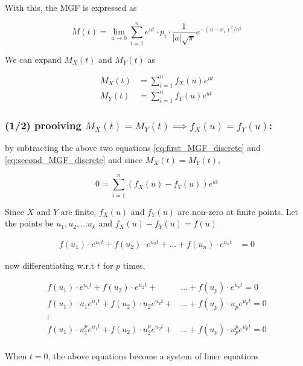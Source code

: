 \documentclass[openany]{book}
\begin{document}
	With this, the MGF is expressed as 
	
	\[ M(t) = \lim_{a \rightarrow 0} \sum_{i=1}^{n} e^{ut} \cdot p_i \cdot \frac{1}{|a|\sqrt{\pi}}e^{-(u-x_i)^2/a^2} \]
	
	We can expand $M_X(t)$ and $M_Y(t)$ as 
	
	\begin{align}
		M_X(t) &= \sum_{i=1}^{n} f_X(u) e^{ut}  \label{eq:first_MGF_discrete}\\
		M_Y(t) &= \sum_{i=1}^{n} f_Y(u) e^{ut}  \label{eq:second_MGF_discrete}
	\end{align}
	
	\subsubsection*{(1/2) prooiving $M_X(t) = M_Y(t) \implies f_X(u) = f_Y(u)$:}
	
	by subtracting the above two equations \ref{eq:first_MGF_discrete} and \ref{eq:second_MGF_discrete} and since $M_X(t) = M_Y(t)$,
	
	\[ 0 = \sum_{i=1}^{n} (f_X(u) - f_Y(u)) e^{ut} \]
	
	Since $X$ and $Y$ are finite, $f_X(u)$ and $f_Y(u)$ are non-zero at finite points. Let the points be $u_1, u_2, \dots u_k$
	and $f_X(u) - f_Y(u) = f(u)$
	
	\begin{align*}
		f(u_1)\cdot e^{u_1t} + f(u_2)\cdot e^{u_2t} + \dots + f(u_n)\cdot e^{u_nt} &= 0
	\end{align*}
	
	now differentiating w.r.t $t$ for $p$ times, 
	
	\begin{align*}
		f(u_1)\cdot e^{u_1t} + f(u_2)\cdot e^{u_2t} + &\dots + f(u_p)\cdot e^{u_pt} = 0 \\ 
		f(u_1)\cdot u_1e^{u_1t} + f(u_2)\cdot u_2e^{u_2t} + &\dots + f(u_p)\cdot u_pe^{u_pt} = 0 \\
		\vdots \\
		f(u_1)\cdot u_1^p e^{u_1t} + f(u_2)\cdot u_2^p e^{u_2t} + &\dots + f(u_p)\cdot u_p^p e^{u_pt} = 0 \\
	\end{align*}
	
	When $t=0$, the above equations become a system of liner equations 
	
\end{document}
